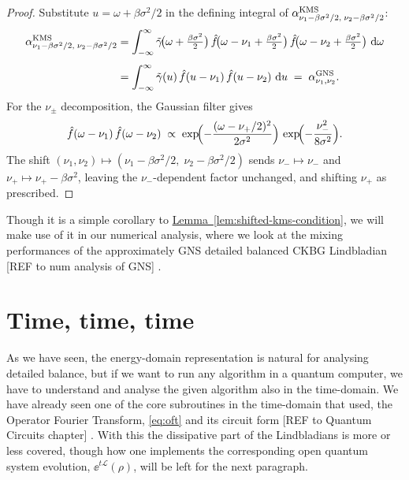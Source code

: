 \begin{proof}
    Substitute $u = \omega + \beta\sigma^2/2$ in the defining integral of
    $\alpha^{\textup{KMS}}_{\nu_1 - \beta\sigma^2/2,\;\nu_2 - \beta\sigma^2/2}$:
    \begin{align*}
      \alpha^{\textup{KMS}}_{\nu_1 - \beta\sigma^2/2,\;\nu_2 - \beta\sigma^2/2}
      &= \int_{-\infty}^{\infty}
        \tilde{\gamma}\!\bigl(\omega + \tfrac{\beta\sigma^2}{2}\bigr)\,
        \hat{f}\!\bigl(\omega - \nu_1 + \tfrac{\beta\sigma^2}{2}\bigr)\,
        \hat{f}\!\bigl(\omega - \nu_2 + \tfrac{\beta\sigma^2}{2}\bigr)\,
        \mathop{}\!\mathrm{d}\omega \\[4pt]
      &= \int_{-\infty}^{\infty}
        \tilde{\gamma}(u)\,
        \hat{f}(u - \nu_1)\,\hat{f}(u - \nu_2)\,\mathop{}\!\mathrm{d} u
      \;=\; \alpha^{\textup{GNS}}_{\nu_1,\nu_2}.
    \end{align*}
    For the $\nu_\pm$ decomposition, the Gaussian filter gives
    $$
      \hat{f}(\omega - \nu_1)\,\hat{f}(\omega - \nu_2)
      \;\propto\;
      \exp\!\Bigl(-\frac{(\omega - \nu_+/2)^2}{2\sigma^2}\Bigr)\,
      \exp\!\Bigl(-\frac{\nu_-^2}{8\sigma^2}\Bigr).
    $$
    The shift $(\nu_1, \nu_2) \mapsto
    (\nu_1 - \beta\sigma^2/2,\;\nu_2 - \beta\sigma^2/2)$ sends
    $\nu_- \mapsto \nu_-$ and $\nu_+ \mapsto \nu_+ - \beta\sigma^2$,
    leaving the $\nu_-$-dependent factor unchanged, and shifting $\nu_+$ as prescribed.
\end{proof}
\noindent Though it is a simple corollary to \hyperref[lem:shifted-kms-condition]{Lemma~\ref*{lem:shifted-kms-condition}}, we will make use of it in our numerical analysis, where we look at the mixing performances of the approximately GNS detailed balanced CKBG Lindbladian [REF to num analysis of GNS] .

\smallskip
\label{sec:ckg-time-domain}
\section{Time, time, time} 
As we have seen, the energy-domain representation is natural for analysing detailed balance, but if we want to run any algorithm in a quantum computer, we have to understand and analyse the given algorithm also in the time-domain. We have already seen one of the core subroutines in the time-domain that \cite{chen2023efficient,chen2023quantum} used, the Operator Fourier Transform, \eqref{eq:oft} and its circuit form [REF to Quantum Circuits chapter] . With this the dissipative part of the Lindbladians is more or less covered, though how one implements the corresponding open quantum system evolution, $\ee^{t\mathcal{L}}(\rho)$, will be left for the next paragraph.

